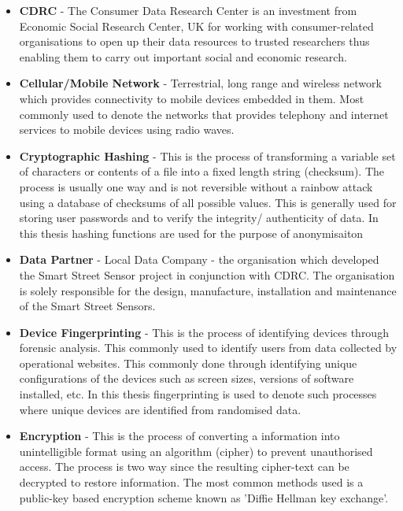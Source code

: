 \begin{itemize}
  \item \textbf{CDRC} - The Consumer Data Research Center is an investment from Economic Social Research Center, UK for working with consumer-related organisations to open up their data resources to trusted researchers thus enabling them to carry out important social and economic research.

  \item \textbf{Cellular/Mobile Network} - Terrestrial, long range and wireless network which provides connectivity to mobile devices embedded in them. Most commonly used to denote the networks that provides telephony and internet services to mobile devices using radio waves. 

  \item \textbf{Cryptographic Hashing} - This is the process of transforming a variable set of characters or contents of a file into a fixed length string (checksum). The process is usually one way and is not reversible without a rainbow attack using a database of checksums of all possible values. This is generally used for storing user passwords and to verify the integrity/ authenticity of data. In this thesis hashing functions are used for the purpose of anonymisaiton 

  \item \textbf{Data Partner} - Local Data Company - the organisation which developed the Smart Street Sensor project in conjunction with CDRC. The organisation is solely responsible for the design, manufacture, installation and maintenance of the Smart Street Sensors.

  \item \textbf{Device Fingerprinting} - This is the process of identifying devices through forensic analysis. This commonly used to identify users from data collected by operational websites. This commonly done through identifying unique configurations of the devices such as screen sizes, versions of software installed, etc. In this thesis fingerprinting is used to denote such processes where unique devices are identified from randomised data.

  \item \textbf{Encryption} - This is the process of converting a information into unintelligible format using an algorithm (cipher) to prevent unauthorised access. The process is two way since the resulting cipher-text can be decrypted to restore information. The most common methods used is a public-key based encryption scheme known as 'Diffie Hellman key exchange'.
    

\end{itemize}
